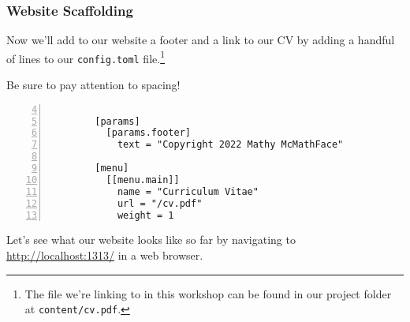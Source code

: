 \begin{frame}[fragile]
    \frametitle{Website Scaffolding}

    Now we'll add to our website a footer and a link to our CV by adding a handful of lines to our \texttt{config.toml} 
    file.\footnote{
      The file we're linking to in this workshop can be found in our project folder at \texttt{content/cv.pdf}.
    } 

    \bigskip
    
    Be sure to pay attention to spacing!

    \smallskip

    \begin{lstlisting}[style=saneCode,gobble=8,title={config.toml},numbers=left,firstnumber=4]
        
        [params]
          [params.footer]
            text = "Copyright 2022 Mathy McMathFace"
        
        [menu]
          [[menu.main]]
            name = "Curriculum Vitae"
            url = "/cv.pdf"
            weight = 1
    \end{lstlisting}

    \vfill

    Let's see what our website looks like so far by navigating to \url{http://localhost:1313/} in a web browser.
\end{frame}